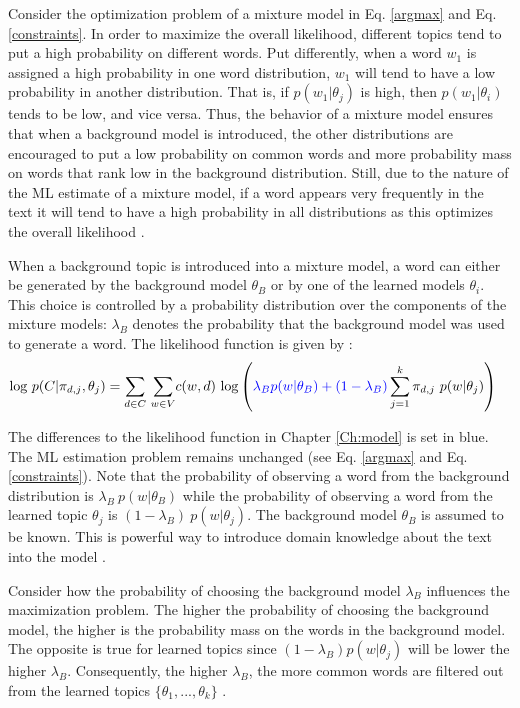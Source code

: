\documentclass[11pt,a4paper,english,oneside]{book}
\numberwithin{equation}{chapter}
\begin{document}
Consider the optimization problem of a mixture model in Eq. \ref{argmax} and Eq. \ref{constraints}. In order to maximize the overall likelihood, different topics tend to put a high probability on different words. Put differently, when a word $w_1$ is assigned a high probability in one word distribution, $w_1$ will tend to have a low probability in another distribution. That is, if $p(w_1|\theta_j)$ is high, then $p(w_1|\theta_i)$ tends to be low, and vice versa. Thus, the behavior of a mixture model ensures that when a background model is introduced, the other distributions are encouraged to put a low probability on common words and more probability mass on words that rank low in the background distribution. Still, due to the nature of the ML estimate of a mixture model, if a word appears very frequently in the text it will tend to have a high probability in all distributions as this optimizes the overall likelihood \citep[pp. 353--359]{Zhai.2016}.

When a background topic is introduced into a mixture model, a word can either be generated by the background model $\theta_B$ or by one of the learned models $\theta_i$. This choice is controlled by a probability distribution over the components of the mixture models: $\lambda_B$ denotes the probability that the background model was used to generate a word. The likelihood function is given by \citep[p. 372]{Zhai.2016}:
\begin{align}
\label{BLL} \text{log} \ p(C|\pi_{d,j},\theta_j) &= \underset{d \in C}{\sum} \ \underset{w \in V}\sum c(w,d) \ \text{log} \left( \textcolor{blue}{\lambda_B p(w|\theta_B) + (1-\lambda_B)} \sum_{j=1}^{k}\pi_{d,j} \ p(w|\theta_j) \right)
\end{align}

The differences to the likelihood function in Chapter \ref{Ch:model} is set in blue. The ML estimation problem remains unchanged (see Eq. \ref{argmax} and Eq. \ref{constraints}). Note that the probability of observing a word from the background distribution is $\lambda_B \ p(w|\theta_B)$ while the probability of observing a word from the learned topic $\theta_j$ is $(1-\lambda_B) \ p(w|\theta_j)$. The background model $\theta_B$ is assumed to be known. %
This is powerful way to introduce domain knowledge about the text into the model \citep[pp. 352, 372--376]{Zhai.2016}. 

Consider how the probability of choosing the background model $\lambda_B$ influences the maximization problem. The higher the probability of choosing the background model, the higher is the probability mass on the words in the background model.  The opposite is true for learned topics since $(1-\lambda_B)  p(w|\theta_j)$ will be lower the higher $\lambda_B$. %
Consequently, the higher $\lambda_B$, the more common words are filtered out from the learned topics $\{\theta_1, ..., \theta_k\}$ \citep[pp. 352--359]{Zhai.2016}.  
\end{document}
